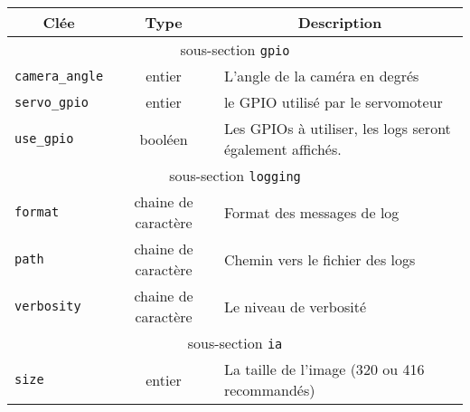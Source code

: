 \begin{table}[H]
    \begin{tabularx}{\linewidth}{|l|c|X|}
        \hline
        \multicolumn{1}{|c|}{\cellcolor{tableColorDark}Clée} & \multicolumn{1}{c|}{\cellcolor{tableColorDark}Type} & \multicolumn{1}{c|}{\cellcolor{tableColorDark}Description} \\ \hline
        \multicolumn{3}{|c|}{\cellcolor{tableColorDark}sous-section \texttt{gpio}}                                                                                                           \\ \hline
        \texttt{camera\_angle}                               & entier                                              & L'angle de la caméra en degrés                             \\ \hline
        \texttt{servo\_gpio}                                 & entier                                              & le GPIO utilisé par le servomoteur                         \\ \hline
        \texttt{use\_gpio}                                   & booléen                                             & Les GPIOs à utiliser, les logs seront également affichés.  \\ \hline
        \multicolumn{3}{|c|}{\cellcolor{tableColorDark}sous-section \texttt{logging}}                                                                                                        \\ \hline
        \texttt{format}                                      & chaine de caractère                                 & Format des messages de log \cite{loggingFormat}            \\ \hline
        \texttt{path}                                        & chaine de caractère                                 & Chemin vers le fichier des logs                            \\ \hline
        \texttt{verbosity}                                   & chaine de caractère                                 & Le niveau de verbosité                                     \\ \hline
        \multicolumn{3}{|c|}{\cellcolor{tableColorDark}sous-section \texttt{ia}}                                                                                                             \\ \hline
        \texttt{size}                                        & entier                                              & La taille de l'image (320 ou 416 recommandés)              \\ \hline

\end{tabularx}
\end{table}
